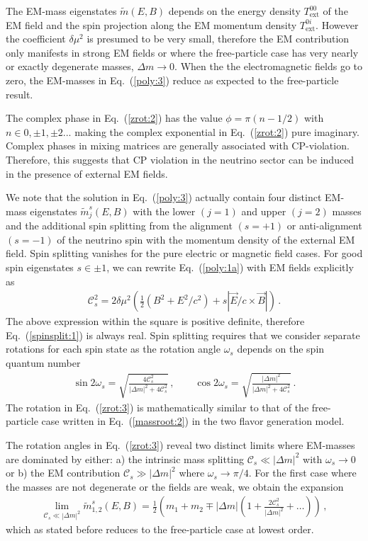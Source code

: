 \documentclass{ws-ijmpa}
\newcommand{\req}[1]{Eq.~(\ref{#1})}
\begin{document}
The EM-mass eigenstates $\widetilde m(E,B)$ depends on the energy density $T_\mathrm{ext}^{00}$ of the EM field and the spin projection along the EM momentum density $T_\mathrm{ext}^{0i}$. However the coefficient $\delta\mu^{2}$ is presumed to be very small, therefore the EM contribution only manifests in strong EM fields or where the free-particle case has very nearly or exactly degenerate masses, $\Delta m\to 0$. When the the electromagnetic fields go to zero, the EM-masses in \req{poly:3} reduce as expected to the free-particle result.

The complex phase in \req{zrot:2} has the value $\phi=\pi(n-1/2)$ with $n\in0,\pm1,\pm2...$ making the complex exponential in \req{zrot:2} pure imaginary. Complex phases in mixing matrices are generally associated with CP-violation. Therefore, this suggests that CP violation in the neutrino sector can be induced in the presence of external EM fields.

We note that the solution in \req{poly:3} actually contain four distinct EM-mass eigenstates $\widetilde m_{j}^{s}(E,B)$ with the lower $(j=1)$ and upper $(j=2)$ masses and the additional spin splitting from the alignment $(s=+1)$ or anti-alignment $(s=-1)$ of the neutrino spin with the momentum density of the external EM field. Spin splitting vanishes for the pure electric or magnetic field cases. For good spin eigenstates $s\in\pm1$, we can rewrite \req{poly:1a} with EM fields explicitly as
\begin{align}
\label{spinsplit:1}
\mathcal{C}^{2}_{s}=2\delta\mu^{2}\left(\frac{1}{2}(B^{2}+E^{2}/c^{2})+s|\vec{E}/c\times\vec{B}|\right)\,.
\end{align}
The above expression within the square is positive definite, therefore \req{spinsplit:1} is always real. Spin splitting requires that we consider separate rotations for each spin state as the rotation angle $\omega_{s}$ depends on the spin quantum number
\begin{align}
\label{zrot:3}
\sin2\omega_{s}=\sqrt{\frac{4\mathcal{C}_{s}^{2}}{|\Delta m|^{2}+4\mathcal{C}_{s}^{2}}}\,,\qquad
\cos2\omega_{s}=\sqrt{\frac{|\Delta m|^{2}}{|\Delta m|^{2}+4\mathcal{C}_{s}^{2}}}\,.
\end{align}
The rotation in \req{zrot:3} is mathematically similar to that of the free-particle case written in \req{massroot:2} in the two flavor generation model.

The rotation angles in \req{zrot:3} reveal two distinct limits where EM-masses are dominated by either: a) the intrinsic mass splitting $\mathcal{C}_{s}\ll|\Delta m|^{2}$ with $\omega_{s}\rightarrow0$ or b) the EM contribution $\mathcal{C}_{s}\gg|\Delta m|^{2}$ where $\omega_{s}\rightarrow\pi/4$.
For the first case where the masses are not degenerate or the fields are weak, we obtain the expansion
\begin{align}
\label{series:1}
\lim_{\mathcal{C}_{s}\ll|\Delta m|^{2}}\widetilde m_{1,2}^{s}(E,B)=\frac{1}{2}\left(m_{1}+m_{2}\mp|\Delta m|\left(1+\frac{2\mathcal{C}_{s}^{2}}{|\Delta m|^{2}}+\ldots\right)\right)\,,
\end{align}
which as stated before reduces to the free-particle case at lowest order.
\end{document}
